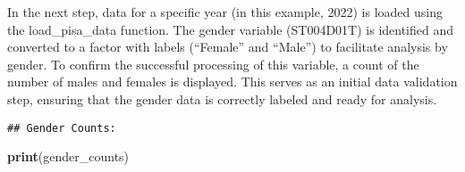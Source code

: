 \documentclass[
]{article}
\newenvironment{Shaded}{\begin{snugshade}}{\end{snugshade}}
\newcommand{\AttributeTok}[1]{\textcolor[rgb]{0.13,0.29,0.53}{#1}}
\newcommand{\CommentTok}[1]{\textcolor[rgb]{0.56,0.35,0.01}{\textit{#1}}}
\newcommand{\ControlFlowTok}[1]{\textcolor[rgb]{0.13,0.29,0.53}{\textbf{#1}}}
\newcommand{\DecValTok}[1]{\textcolor[rgb]{0.00,0.00,0.81}{#1}}
\newcommand{\FunctionTok}[1]{\textcolor[rgb]{0.13,0.29,0.53}{\textbf{#1}}}
\newcommand{\NormalTok}[1]{#1}
\newcommand{\OtherTok}[1]{\textcolor[rgb]{0.56,0.35,0.01}{#1}}
\newcommand{\SpecialCharTok}[1]{\textcolor[rgb]{0.81,0.36,0.00}{\textbf{#1}}}
\newcommand{\StringTok}[1]{\textcolor[rgb]{0.31,0.60,0.02}{#1}}
\begin{document}
In the next step, data for a specific year (in this example, 2022) is
loaded using the load\_pisa\_data function. The gender variable
(ST004D01T) is identified and converted to a factor with labels
(``Female'' and ``Male'') to facilitate analysis by gender. To confirm
the successful processing of this variable, a count of the number of
males and females is displayed. This serves as an initial data
validation step, ensuring that the gender data is correctly labeled and
ready for analysis.

\begin{Shaded}
\end{Shaded}

\begin{verbatim}
## Gender Counts:
\end{verbatim}

\begin{Shaded}
\begin{Highlighting}[]
\FunctionTok{print}\NormalTok{(gender\_counts)}
\end{Highlighting}
\end{Shaded}
\end{document}
